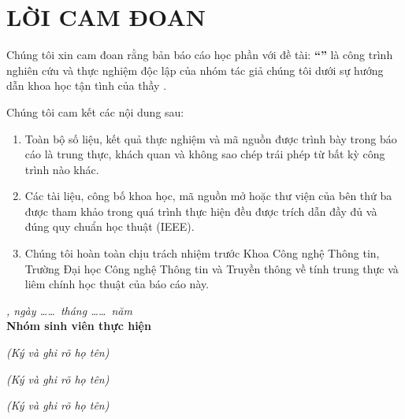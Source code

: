 
\chapter*{LỜI CAM ĐOAN}

Chúng tôi xin cam đoan rằng bản báo cáo học phần với đề tài: \textbf{``\reporttitle''} là công trình nghiên cứu và thực nghiệm độc lập của nhóm tác giả chúng tôi dưới sự hướng dẫn khoa học tận tình của thầy \textbf{\supervisor}.

Chúng tôi cam kết các nội dung sau:
\begin{enumerate}[label=\alph*)]
    \item Toàn bộ số liệu, kết quả thực nghiệm và mã nguồn được trình bày trong báo cáo là trung thực, khách quan và không sao chép trái phép từ bất kỳ công trình nào khác.
    \item Các tài liệu, công bố khoa học, mã nguồn mở hoặc thư viện của bên thứ ba được tham khảo trong quá trình thực hiện đều được trích dẫn đầy đủ và đúng quy chuẩn học thuật (IEEE).
    \item Chúng tôi hoàn toàn chịu trách nhiệm trước Khoa Công nghệ Thông tin, Trường Đại học Công nghệ Thông tin và Truyền thông về tính trung thực và liêm chính học thuật của báo cáo này.
\end{enumerate}

\vspace{1.2cm}
\begin{center}
    \textit{\location, ngày \dots\dots\ tháng \dots\dots\ năm \reportyear}\\[8pt]
    \textbf{Nhóm sinh viên thực hiện}
\end{center}

\vspace{0.8cm}
\noindent
\begin{minipage}[t]{0.32\textwidth}
    \centering
    \textit{(Ký và ghi rõ họ tên)}\\[55pt]
    \textbf{\leadername}
\end{minipage}
\hfill
\begin{minipage}[t]{0.32\textwidth}
    \centering
    \textit{(Ký và ghi rõ họ tên)}\\[55pt]
    \textbf{\membertwoname}
\end{minipage}
\hfill
\begin{minipage}[t]{0.32\textwidth}
    \centering
    \textit{(Ký và ghi rõ họ tên)}\\[55pt]
    \textbf{\memberthreename}
\end{minipage}

\clearpage
